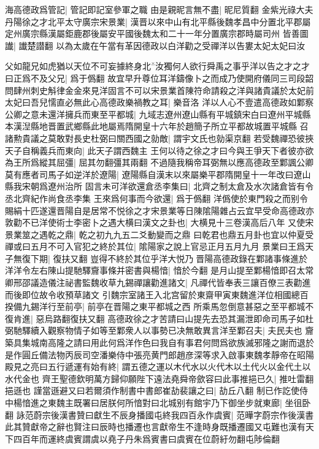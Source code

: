 海高德政爲管記|{
	管記即記室參軍之職}
由是親昵言無不盡|{
	昵尼質翻}
金紫光祿大夫丹陽徐之才北平太守廣宗宋景業|{
	漢晋以來中山有北平縣後魏孝昌中分置北平郡屬定州廣宗縣漢屬鉅鹿郡後屬安平國後魏太和二十一年分置廣宗郡時屬司州}
皆善圖䜟|{
	䜟楚譛翻}
以為太歲在午當有革因德政以白洋勸之受禪洋以告婁太妃太妃曰汝

父如龍兄如虎猶以天位不可妄據終身北汝獨何人欲行舜禹之事乎洋以告之才之才曰正爲不及父兄|{
	爲于僞翻}
故宜早升尊位耳洋鑄像卜之而成乃使開府儀同三司段韶問肆州刺史斛律金金來見洋固言不可以宋景業首陳符命請殺之洋與諸貴議於太妃前太妃曰吾兒懦直必無此心高德政樂禍教之耳|{
	樂音洛}
洋以人心不壹遣高德政如鄴察公卿之意未還洋擁兵而東至平都城|{
	九域志遼州遼山縣有平城鎮宋白曰遼州平城縣本漢湼縣地晋置武鄉縣此地屬焉隋開皇十六年於趙簡子所立平都故城置平城縣}
召諸勲貴議之莫敢對長史杜弼曰關西國之勍敵|{
	謂宇文氏也勍渠京翻}
若受魏禪恐彼挾天子自稱義兵而東向|{
	此天子謂西魏主}
王何以待之徐之才曰今與王爭天下者彼亦欲為王所爲縱其屈彊|{
	屈其勿翻彊其兩翻}
不過隨我稱帝耳弼無以應高德政至鄴諷公卿莫有應者司馬子如逆洋於遼陽|{
	遼陽縣自漢末以來屬樂平郡隋開皇十一年改曰遼山縣我宋朝爲遼州治所}
固言未可洋欲還倉丞李集曰|{
	北齊之制太倉及水次諸倉皆有令丞北齊紀作尚食丞李集}
王來爲何事而今欲還|{
	爲于僞翻}
洋僞使於東門殺之而别令賜絹十匹遂還晋陽自是居常不悦徐之才宋景業等日陳隂陽雜占云宜早受命高德政亦敦勸不已洋使術士李密卜之遇大横曰漢文之卦也|{
	大横見十三卷漢高后八年}
又使宋景業筮之遇乾之鼎|{
	乾之初九九五二爻動變而之鼎}
曰乾君也鼎五月卦也宜以仲夏受禪或曰五月不可入官犯之終於其位|{
	隂陽家之說上官忌正月五月九月}
景業曰王爲天子無復下期|{
	復扶又翻}
豈得不終於其位乎洋大悦乃晋陽高德政錄在鄴諸事條進於洋洋令左右陳山提馳驛齎事條并密書與楊愔|{
	愔於今翻}
是月山提至鄴楊愔即召太常卿邢邵議造儀注祕書監魏收草九錫禪讓勸進諸文|{
	凡禪代皆奉表三讓百僚三表勸進而後即位故令收預草諸文}
引魏宗室諸王入北宫留於東齋甲寅東魏進洋位相國總百揆備九錫洋行至前亭|{
	前亭在晋陽之東平都城之西}
所乘馬忽倒意甚惡之至平都城不復肯進|{
	惡烏路翻復扶又翻}
高德政徐之才苦請曰山提先去恐其漏泄即命司馬子如杜弼馳驛續入觀察物情子如等至鄴衆人以事勢已决無敢異言洋至鄴召夫|{
	夫民夫也}
齎築具集城南高隆之請曰用此何爲洋作色曰我自有事君何問爲欲族滅邪隆之謝而退於是作圓丘備法物丙辰司空潘樂侍中張亮黄門郎趙彦深等求入啟事東魏孝靜帝在昭陽殿見之亮曰五行遞運有始有終|{
	謂五德之運以木代水以火代木以土代火以金代土以水代金也}
齊王聖德欽明萬方歸仰願陛下遠法堯舜帝歛容曰此事推挹已久|{
	推吐雷翻挹遜也}
謹當遜避又曰若爾須作制書中書郎崔劼裴讓之曰|{
	劼丘八翻}
制已作訖使侍中楊愔進之東魏主既署曰居朕何所愔對曰北城别有館宇乃下御坐步就東廊|{
	坐徂卧翻}
詠范蔚宗後漢書贊曰獻生不辰身播國屯終我四百永作虞賓|{
	范曄字蔚宗作後漢書此其贊獻帝之辭也賢注曰辰時也播遷也言獻帝生不逢時身既播遷國又屯難也漢有天下四百年而運終虞賓謂虞以堯子丹朱爲賓書曰虞賓在位蔚紆勿翻屯陟倫翻}
